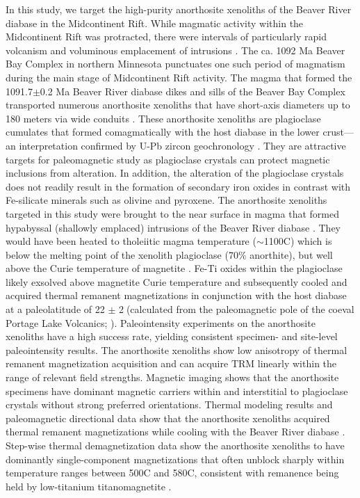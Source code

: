 In this study, we target the high-purity anorthosite xenoliths of the Beaver River diabase in the Midcontinent Rift. While magmatic activity within the Midcontinent Rift was protracted, there were intervals of particularly rapid volcanism and voluminous emplacement of intrusions \citep{Swanson-Hysell2021a}. The ca. 1092 Ma Beaver Bay Complex in northern Minnesota punctuates one such period of magmatism during the main stage of Midcontinent Rift activity. The magma that formed the 1091.7$\pm$0.2 Ma Beaver River diabase dikes and sills of the Beaver Bay Complex transported numerous anorthosite xenoliths that have short-axis diameters up to 180 meters via wide conduits \citep{Boerboom2004a, Boerboom2006b}. These anorthosite xenoliths are plagioclase cumulates that formed comagmatically with the host diabase in the lower crust---an interpretation confirmed by U-Pb zircon geochronology \citep{Zhang2021b}. They are attractive targets for paleomagnetic study as plagioclase crystals can protect magnetic inclusions from alteration. In addition, the alteration of the plagioclase crystals does not readily result in the formation of secondary iron oxides in contrast with Fe-silicate minerals such as olivine and pyroxene. The anorthosite xenoliths targeted in this study were brought to the near surface in magma that formed hypabyssal (shallowly emplaced) intrusions of the Beaver River diabase \citep{Zhang2021b}. They would have been heated to tholeiitic magma temperature ($\sim$1100\textdegree C) which is below the melting point of the xenolith plagioclase (70$\%$ anorthite), but well above the Curie temperature of magnetite \citep{Zhang2021b}. Fe-Ti oxides within the plagioclase likely exsolved above magnetite Curie temperature \citep{Bian2021a} and subsequently cooled and acquired thermal remanent magnetizations in conjunction with the host diabase at a paleolatitude of 22 $\pm$ 2\textdegree$\;$(calculated from the paleomagnetic pole of the coeval Portage Lake Volcanics; \citealp{Swanson-Hysell2019a}). Paleointensity experiments on the anorthosite xenoliths have a high success rate, yielding consistent specimen- and site-level paleointensity results. The anorthosite xenoliths show low anisotropy of thermal remanent magnetization acquisition and can acquire TRM linearly within the range of relevant field strengths. Magnetic imaging shows that the anorthosite specimens have dominant magnetic carriers within and interstitial to plagioclase crystals without strong preferred orientations. Thermal modeling results and paleomagnetic directional data show that the anorthosite xenoliths acquired thermal remanent magnetizations while cooling with the Beaver River diabase \citep{Zhang2021b}. Step-wise thermal demagnetization data show the anorthosite xenoliths to have dominantly single-component magnetizations that often unblock sharply within temperature ranges between 500\textdegree C and 580\textdegree C, consistent with remanence being held by low-titanium titanomagnetite \citep{Zhang2021b}. 

